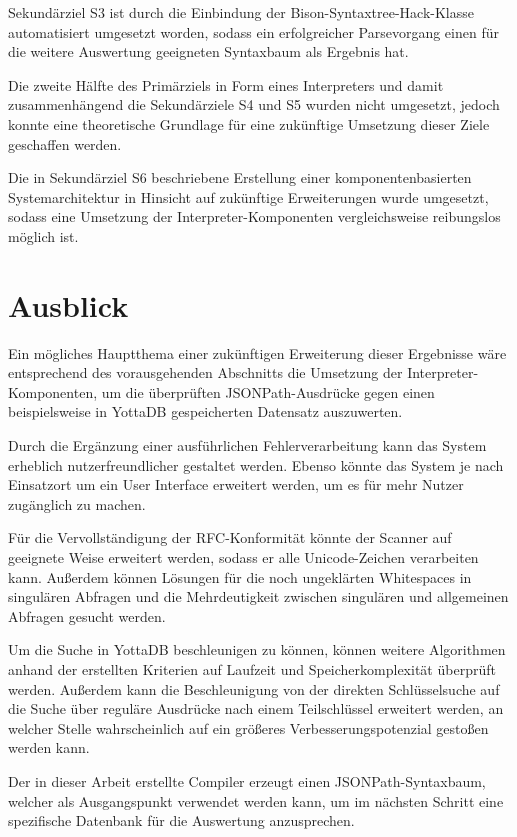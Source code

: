 \documentclass[oneside]{ausarbeitung}
\begin{document}
Sekundärziel S3 ist durch die Einbindung der Bison-Syntaxtree-Hack-Klasse automatisiert umgesetzt worden, sodass ein erfolgreicher Parsevorgang einen für die weitere Auswertung geeigneten Syntaxbaum als Ergebnis hat.

Die zweite Hälfte des Primärziels in Form eines Interpreters und damit zusammenhängend die Sekundärziele S4 und S5 wurden nicht umgesetzt, jedoch konnte eine theoretische Grundlage für eine zukünftige Umsetzung dieser Ziele geschaffen werden.

Die in Sekundärziel S6 beschriebene Erstellung einer komponentenbasierten Systemarchitektur in Hinsicht auf zukünftige Erweiterungen wurde umgesetzt, sodass eine Umsetzung der Interpreter-Komponenten vergleichsweise reibungslos möglich ist.


\pagebreak

\section{Ausblick}
\label{sec:ausblick}

Ein mögliches Hauptthema einer zukünftigen Erweiterung dieser Ergebnisse wäre entsprechend des vorausgehenden Abschnitts die Umsetzung der Interpreter-Komponenten, um die überprüften JSONPath-Ausdrücke gegen einen beispielsweise in YottaDB gespeicherten Datensatz auszuwerten.

Durch die Ergänzung einer ausführlichen Fehlerverarbeitung kann das System erheblich nutzerfreundlicher gestaltet werden. Ebenso könnte das System je nach Einsatzort um ein User Interface erweitert werden, um es für mehr Nutzer zugänglich zu machen.

Für die Vervollständigung der RFC-Konformität könnte der Scanner auf geeignete Weise erweitert werden, sodass er alle Unicode-Zeichen verarbeiten kann. Außerdem können Lösungen für die noch ungeklärten Whitespaces in singulären Abfragen und die Mehrdeutigkeit zwischen singulären und allgemeinen Abfragen gesucht werden.

Um die Suche in YottaDB beschleunigen zu können, können weitere Algorithmen anhand der erstellten Kriterien auf Laufzeit und Speicherkomplexität überprüft werden. Außerdem kann die Beschleunigung von der direkten Schlüsselsuche auf die Suche über reguläre Ausdrücke nach einem Teilschlüssel erweitert werden, an welcher Stelle wahrscheinlich auf ein größeres Verbesserungspotenzial gestoßen werden kann.

Der in dieser Arbeit erstellte Compiler erzeugt einen JSONPath-Syntaxbaum, welcher als Ausgangspunkt verwendet werden kann, um im nächsten Schritt eine spezifische Datenbank für die Auswertung anzusprechen.
\end{document}
